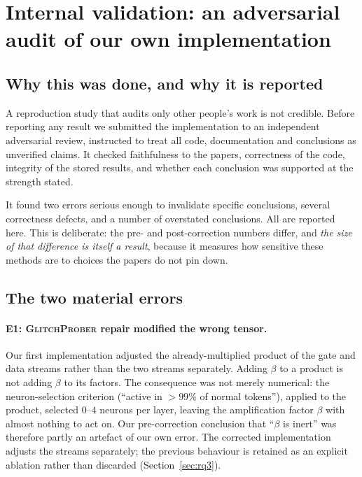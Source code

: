 \documentclass[11pt,a4paper]{article}
\newcommand{\gp}{\textsc{GlitchProber}}
\begin{document}
\section{Internal validation: an adversarial audit of our own implementation}
\label{sec:audit}

\subsection{Why this was done, and why it is reported}

A reproduction study that audits only other people's work is not credible. Before
reporting any result we submitted the implementation to an independent adversarial
review, instructed to treat all code, documentation and conclusions as unverified
claims. It checked faithfulness to the papers, correctness of the code, integrity
of the stored results, and whether each conclusion was supported at the strength
stated.

It found two errors serious enough to invalidate specific conclusions, several
correctness defects, and a number of overstated conclusions. All are reported
here. This is deliberate: the pre- and post-correction numbers differ, and
\emph{the size of that difference is itself a result}, because it measures how
sensitive these methods are to choices the papers do not pin down.

\subsection{The two material errors}

\paragraph{E1: \gp{} repair modified the wrong tensor.}
Our first implementation adjusted the already-multiplied product of the gate and
data streams rather than the two streams separately. Adding $\beta$ to a product
is not adding $\beta$ to its factors. The consequence was not merely numerical:
the neuron-selection criterion (``active in $>99\%$ of normal tokens''), applied
to the product, selected $0$--$4$ neurons per layer, leaving the amplification
factor $\beta$ with almost nothing to act on. Our pre-correction conclusion that
``$\beta$ is inert'' was therefore partly an artefact of our own error. The
corrected implementation adjusts the streams separately; the previous behaviour is
retained as an explicit ablation rather than discarded (Section~\ref{sec:rq3}).
\end{document}
